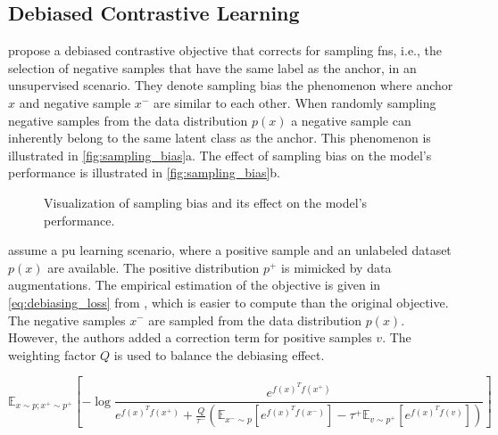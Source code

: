 \subsection{Debiased Contrastive Learning}\label{subsec:debiasing_cl}

\citet{chuang_debiased_2020} propose a debiased contrastive objective that corrects for sampling \acp{fn}, 
i.e., the selection of negative samples that have the same label as the anchor, in an unsupervised scenario.
They denote sampling bias the phenomenon where anchor $x$ and negative sample $x^-$ are similar to each other.
When randomly sampling negative samples from the data distribution $p(x)$ 
a negative sample can inherently belong to the same latent class as the anchor.
This phenomenon is illustrated in \autoref{fig:sampling_bias}a.
The effect of sampling bias on the model's performance is illustrated in \autoref{fig:sampling_bias}b.

\begin{figure}%
    \centering
    \qquad
    \caption{Visualization of sampling bias and its effect on the model's performance.}%
    \label{fig:sampling_bias}%
\end{figure}

\citeauthor{chuang_debiased_2020} assume a \ac{pu} learning scenario, 
where a positive sample and an unlabeled dataset $p(x)$ are available.
The positive distribution $p^+$ is mimicked by data augmentations.
The empirical estimation of the objective is given in 
\autoref{eq:debiasing_loss} from \citet{chuang_debiased_2020},
which is easier to compute than the original objective.
The negative samples $x^-$ are sampled from the data distribution $p(x)$.
However, the authors added a correction term for positive samples $v$.
The weighting factor $Q$ is used to balance the debiasing effect.

\begin{equation}
    \mathbb{E}_{x \sim p; x^+ \sim p^+}[{-\log{\frac{e^{f(x)^Tf(x^+)}}{e^{f(x)^Tf(x^+)}+ \frac{Q}{\tau^-}(\mathbb{E}_{x^- \sim p}[e^{f(x)^Tf(x^-)}]-\tau^+\mathbb{E}_{v \sim p^+}[e^{f(x)^Tf(v)}])}}}]
    \label{eq:debiasing_loss}
\end{equation}
